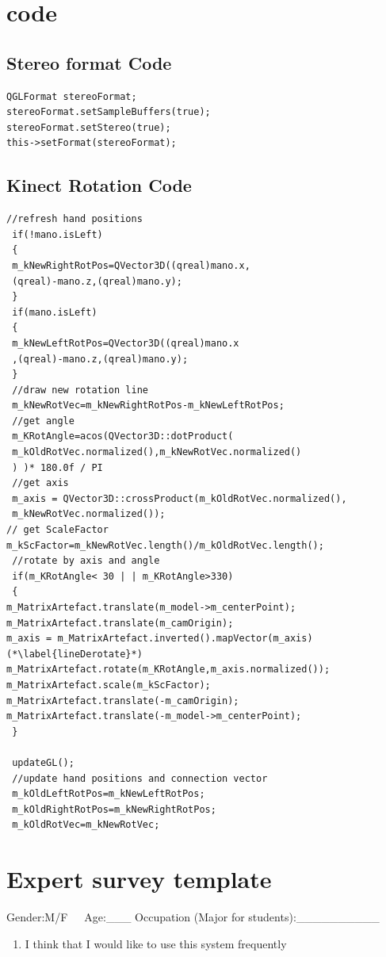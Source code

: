 \documentclass[12pt]{extarticle}
\begin{document}
\begin{appendices}
\section{code}
\subsection {Stereo format Code}\label{app:StereoFormat}
\begin{lstlisting}
QGLFormat stereoFormat;
stereoFormat.setSampleBuffers(true);
stereoFormat.setStereo(true);
this->setFormat(stereoFormat);
\end{lstlisting}
\subsection {Kinect Rotation Code}\label{app:codeRot}
\begin{lstlisting}
//refresh hand positions
 if(!mano.isLeft)
 {
 m_kNewRightRotPos=QVector3D((qreal)mano.x,
 (qreal)-mano.z,(qreal)mano.y);
 }
 if(mano.isLeft)
 {
 m_kNewLeftRotPos=QVector3D((qreal)mano.x
 ,(qreal)-mano.z,(qreal)mano.y);
 }
 //draw new rotation line
 m_kNewRotVec=m_kNewRightRotPos-m_kNewLeftRotPos;
 //get angle
 m_KRotAngle=acos(QVector3D::dotProduct(
 m_kOldRotVec.normalized(),m_kNewRotVec.normalized()
 ) )* 180.0f / PI
 //get axis
 m_axis = QVector3D::crossProduct(m_kOldRotVec.normalized(),
 m_kNewRotVec.normalized());
// get ScaleFactor
m_kScFactor=m_kNewRotVec.length()/m_kOldRotVec.length();
 //rotate by axis and angle
 if(m_KRotAngle< 30 | | m_KRotAngle>330)
 {
m_MatrixArtefact.translate(m_model->m_centerPoint);
m_MatrixArtefact.translate(m_camOrigin);
m_axis = m_MatrixArtefact.inverted().mapVector(m_axis)(*\label{lineDerotate}*)
m_MatrixArtefact.rotate(m_KRotAngle,m_axis.normalized());
m_MatrixArtefact.scale(m_kScFactor);
m_MatrixArtefact.translate(-m_camOrigin);
m_MatrixArtefact.translate(-m_model->m_centerPoint);
 }

 updateGL();
 //update hand positions and connection vector
 m_kOldLeftRotPos=m_kNewLeftRotPos;
 m_kOldRightRotPos=m_kNewRightRotPos;
 m_kOldRotVec=m_kNewRotVec;
\end{lstlisting}

\pagebreak{}
\section{Expert survey template}\label{app:survey}
\begin{center}
Gender:M/F\ \ \ Age:\_\_\_ Occupation (Major for students):\_\_\_\_\_\_\_\_\_\_
\begin{enumerate}
\item I think that I would like to use this system frequently


\end{enumerate}
\end{center}
\end{appendices}
\end{document}
